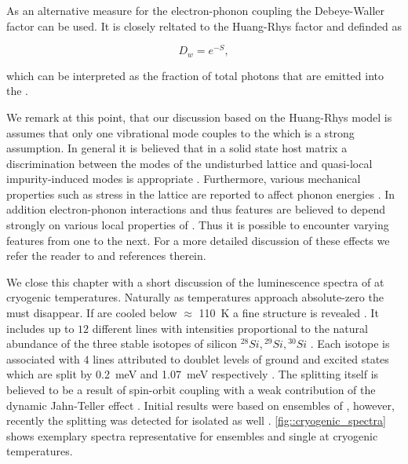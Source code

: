    As an alternative measure for the electron-phonon coupling the Debeye-Waller factor can be used. It is closely reltated to the Huang-Rhys factor and definded as

   \begin{equation}
     D_w = e^{-S},
   \end{equation}

    which can be interpreted as the fraction of total photons that are emitted into the \zpl.

    We remark at this point, that our discussion based on the Huang-Rhys model is assumes that only one vibrational mode couples to the \cc which is a strong assumption. In general it is believed that in a solid state host matrix a discrimination between the modes of the undisturbed lattice and quasi-local impurity-induced modes is appropriate \cite{Zaitsev2000, Feng1993b, Solin1970}. Furthermore, various mechanical properties such as stress in the lattice are reported to affect phonon energies \cite{Grimsditch1978}. In addition electron-phonon interactions and thus \psb features are believed to depend strongly on various local properties of \ccs \cite{Sternschulte1994, Huttner1995}. Thus it is possible to encounter varying \psb features from one \siv to the next. For a more detailed discussion of these effects we refer the reader to \cite{neu2012, janine::thesis} and references therein.

    We close this chapter with a short discussion of the luminescence spectra of \sivs at cryogenic temperatures. Naturally as temperatures approach absolute-zero the \psb must disappear. If \sivs are cooled below $\approx$ \SI{110}{\kelvin} a fine structure is revealed \cite{becker::45}. It includes up to $12$ different lines with intensities proportional to the natural abundance of the three stable isotopes of silicon ${}^{28}Si, {}^{29}Si, {}^{30}Si$ \cite{janine::231}. Each isotope is associated with $4$ lines attributed to doublet levels of ground and excited states which are split by \SI{0.2}{\milli\eV} and \SI{1.07}{\milli\eV} respectively \cite{janine::26, janine::223, janine::231}. The splitting itself is believed to be a result of spin-orbit coupling with a weak contribution of the dynamic Jahn-Teller effect \cite{janine::223}. Initial results were based on ensembles of \sivs, however, recently the splitting was detected for isolated \sivs as well \cite{janine::226}. \cref{fig::cryogenic_spectra} shows exemplary spectra representative for ensembles and single \siv at cryogenic temperatures.

